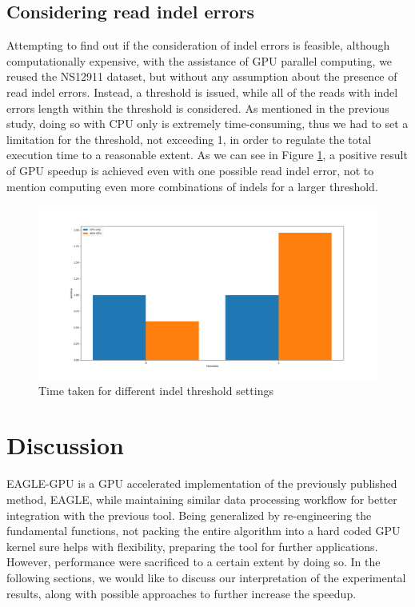 \documentclass{PHlab-thesis}
\begin{document}
\section{Considering read indel errors}
Attempting to find out if the consideration of indel errors is feasible, although computationally expensive, with the assistance of GPU parallel computing, we reused the NS12911 dataset, but without any assumption about the presence of read indel errors. Instead, a threshold is issued, while all of the reads with indel errors length within the threshold is considered. As mentioned in the previous study, doing so with CPU only is extremely time-consuming, thus we had to set a limitation for the threshold, not exceeding 1, in order to regulate the total execution time to a reasonable extent. As we can see in Figure \ref{fig:readindel}, a positive result of GPU speedup is achieved even with one possible read indel error, not to mention computing even more combinations of indels for a larger threshold.
\begin{figure}
	\centering
	\includegraphics[scale=0.3]{figures/read_indel.png}
	\caption{Time taken for different indel threshold settings}
	\label{fig:readindel} 
\end{figure}

\chapter{Discussion}
EAGLE-GPU is a GPU accelerated implementation of the previously published method, EAGLE, while maintaining similar data processing workflow for better integration with the previous tool. Being generalized by re-engineering the fundamental functions, not packing the entire algorithm into a hard coded GPU kernel sure helps with flexibility, preparing the tool for further applications. However, performance were sacrificed to a certain extent by doing so. In the following sections, we would like to discuss our interpretation of the experimental results, along with possible approaches to further increase the speedup.
\end{document}
